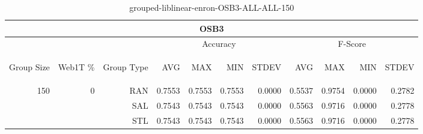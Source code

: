 \begin{center}
\begin{table}[htbp] 
 \begin{center}
\begin{tabular}{ | r | r | r | r | r | r | r | r | r | r | r |}
\hline
\multicolumn{11}{|c|}{OSB3}\\
\hline
 & & & \multicolumn{4}{|c|}{Accuracy} & \multicolumn{4}{|c|}{F-Score}\\ \cline{4-11}
\begin{sideways}Group Size\end{sideways} & \begin{sideways}Web1T \%\end{sideways} & \begin{sideways}Group Type\end{sideways} & \begin{sideways}AVG\end{sideways} & \begin{sideways}MAX\end{sideways} & \begin{sideways}MIN\end{sideways} & \begin{sideways}STDEV\end{sideways} & \begin{sideways}AVG\end{sideways} & \begin{sideways}MAX\end{sideways} & \begin{sideways}MIN\end{sideways} & \begin{sideways}STDEV\end{sideways}\\
\hline
\multirow{3}{*}{150}
 & \multirow{3}{*}{0} & RAN & 0.7553 & 0.7553 & 0.7553 & 0.0000 & 0.5537 & 0.9754 & 0.0000 & 0.2782\\ \cline{3-11}
 &   & SAL & 0.7543 & 0.7543 & 0.7543 & 0.0000 & 0.5563 & 0.9716 & 0.0000 & 0.2778\\ \cline{3-11}
 &   & STL & 0.7543 & 0.7543 & 0.7543 & 0.0000 & 0.5563 & 0.9716 & 0.0000 & 0.2778\\ \cline{2-11}
\hline
\end{tabular}
\caption{grouped-liblinear-enron-OSB3-ALL-ALL-150}
\end{center}
 \end{table}
\end{center}

